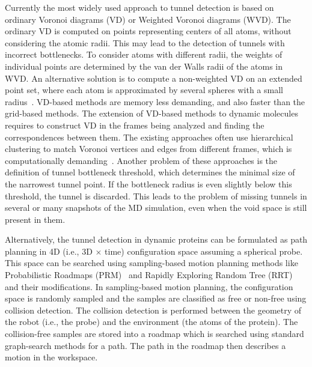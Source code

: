 \documentclass[usletter, 10pt, conference]{svjour3}      %
\begin{document}
Currently the most widely used approach to tunnel detection is based on ordinary Voronoi diagrams (VD) or Weighted Voronoi diagrams (WVD).
The ordinary VD is computed on points representing centers of all atoms, without considering the atomic radii.
This may lead to the detection of tunnels with incorrect bottlenecks. %
To consider atoms with different radii, the weights of individual points are determined by the van der Walls radii of the atoms in WVD.
An alternative solution is to compute a non-weighted VD on an extended point set, where each atom is approximated by several spheres with a small radius~\cite{yaffe2008,caver3,caverDetails}.
VD-based methods are memory less demanding, and also faster than the grid-based methods.
The extension of VD-based methods to dynamic molecules requires to construct VD in the frames being analyzed and finding the correspondences between them.
The existing approaches often use hierarchical clustering to match Voronoi vertices and edges from different frames, which is computationally demanding~\cite{lindow2012dynamic,caverDetails}.
Another problem of these approaches is the definition of tunnel bottleneck threshold, which determines the minimal size of the narrowest tunnel point.
If the bottleneck radius is even slightly below this threshold, the tunnel is discarded. 
This leads to the problem of missing tunnels in several or many snapshots of the MD simulation, even when the void space is still present in them.













Alternatively, the tunnel detection in dynamic proteins can be formulated as path planning in 4D (i.e., 3D $\times$ time) configuration space assuming a spherical probe.
This space can be searched using sampling-based motion planning methods like Probabilistic Roadmaps (PRM)~\cite{kavrakiPRM} and Rapidly Exploring Random Tree (RRT)~\cite{lavalleRRT} and their modifications.
In sampling-based motion planning, the configuration space is randomly sampled and the samples are classified as free or non-free using collision detection.
The collision detection is performed between the geometry of the robot (i.e., the probe) and the environment (the atoms of the protein).
The collision-free samples are stored into a roadmap which is searched using standard graph-search methods for a path.
The path in the roadmap then describes a motion in the workspace.
\end{document}

